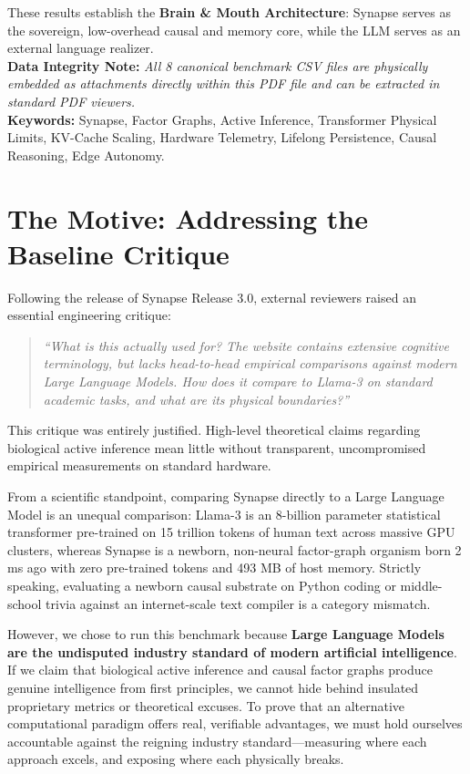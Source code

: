 \documentclass[11pt,a4paper]{article}
\begin{document}
\begin{abstractbox}
\begin{enumerate}[leftmargin=1.5em, itemsep=1pt, topsep=2pt]
  \end{enumerate}
  These results establish the \textbf{Brain \& Mouth Architecture}: Synapse serves as the sovereign, low-overhead causal and memory core, while the LLM serves as an external language realizer.\\[0.3em]
  \noindent\textbf{\textsf{\color{brandnavy}Data Integrity Note:}} \textit{All 8 canonical benchmark CSV files are physically embedded as attachments directly within this PDF file and can be extracted in standard PDF viewers.}\\[0.2em]
  \noindent\textbf{\textsf{\color{brandnavy}Keywords:}} \textsf{Synapse, Factor Graphs, Active Inference, Transformer Physical Limits, KV-Cache Scaling, Hardware Telemetry, Lifelong Persistence, Causal Reasoning, Edge Autonomy.}
\end{abstractbox}

\vspace{0.2em}

\section{The Motive: Addressing the Baseline Critique}
Following the release of Synapse Release 3.0, external reviewers raised an essential engineering critique:
\begin{quote}
\textit{``What is this actually used for? The website contains extensive cognitive terminology, but lacks head-to-head empirical comparisons against modern Large Language Models. How does it compare to Llama-3 on standard academic tasks, and what are its physical boundaries?''}
\end{quote}
This critique was entirely justified. High-level theoretical claims regarding biological active inference mean little without transparent, uncompromised empirical measurements on standard hardware.

From a scientific standpoint, comparing Synapse directly to a Large Language Model is an unequal comparison: Llama-3 is an 8-billion parameter statistical transformer pre-trained on 15 trillion tokens of human text across massive GPU clusters, whereas Synapse is a newborn, non-neural factor-graph organism born 2 ms ago with zero pre-trained tokens and 493 MB of host memory. Strictly speaking, evaluating a newborn causal substrate on Python coding or middle-school trivia against an internet-scale text compiler is a category mismatch.

However, we chose to run this benchmark because \textbf{Large Language Models are the undisputed industry standard of modern artificial intelligence}. If we claim that biological active inference and causal factor graphs produce genuine intelligence from first principles, we cannot hide behind insulated proprietary metrics or theoretical excuses. To prove that an alternative computational paradigm offers real, verifiable advantages, we must hold ourselves accountable against the reigning industry standard—measuring where each approach excels, and exposing where each physically breaks.
\end{document}
